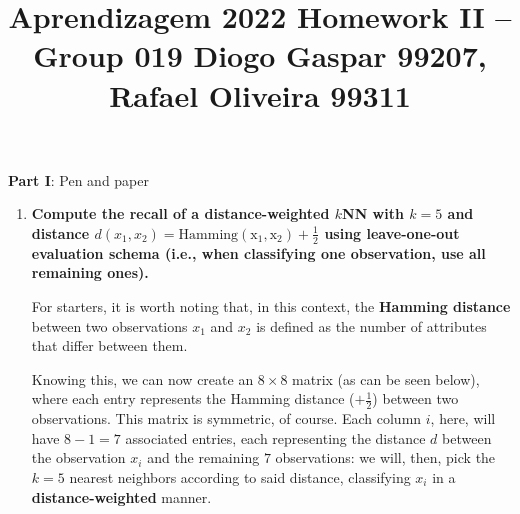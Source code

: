 \documentclass[12pt]{article}
\title{\large{Aprendizagem 2022}\vskip 0.2cm Homework II -- Group 019\vskip 0.2cm Diogo Gaspar 99207, Rafael Oliveira 99311}
\date{}
\begin{document}
\maketitle
\center\large{\vskip -2.5cm\textbf{Part I}: Pen and paper}
\begin{enumerate}[leftmargin=\labelsep]

  \item \textbf{Compute the recall of a distance-weighted $k$NN with $k=5$ and distance
          $d(x_1, x_2) = \operatorname{Hamming(x_1, x_2)} + \frac{1}{2}$ using leave-one-out
          evaluation schema (i.e., when classifying one observation, use all remaining ones).}

        For starters, it is worth noting that, in this context, the \textbf{Hamming distance} between two
        observations $x_1$ and $x_2$ is defined as the number of attributes that differ between them.

        Knowing this, we can now create an $8 \times 8$ matrix (as can be seen below), where each entry
        represents the Hamming distance ($+ \frac{1}{2}$) between two observations. This matrix is symmetric, of course.
        Each column $i$, here, will have $8 - 1 = 7$ associated entries, each representing the distance $d$
        between the observation $x_i$ and the remaining $7$ observations: we will, then,
        pick the $k = 5$ nearest neighbors according to said distance, classifying $x_i$
        in a \textbf{distance-weighted} manner.


\end{enumerate}
\end{document}
